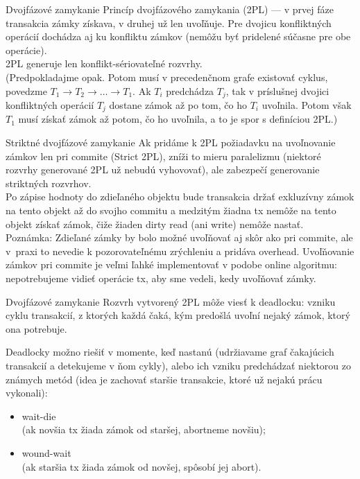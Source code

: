 \documentclass[12pt]{beamer}
\def\blue#1{\textcolor{Cerulean}{#1}}
\begin{document}
\begin{frame}[fragile]{Dvojfázové zamykanie}
Princíp dvojfázového zamykania (2PL) --- v prvej fáze transakcia zámky získava,
v druhej už len uvoľňuje. Pre dvojicu konfliktných operácií dochádza aj ku konfliktu zámkov
(nemôžu byť pridelené súčasne pre obe operácie).\\[2mm]

\blue{2PL generuje len konflikt-sériovateľné rozvrhy.}\\[2mm]

(Predpokladajme opak. Potom musí v precedenčnom grafe existovať cyklus,
povedzme $T_1 \rightarrow T_2 \rightarrow \dots \rightarrow T_1$.
Ak $T_i$ predchádza $T_j$, tak v príslušnej dvojici konfliktných operácií $T_j$ dostane zámok až po tom,
čo ho $T_i$ uvoľnila.
Potom však $T_1$ musí získať zámok až potom, čo ho uvoľnila, a to je spor s definíciou 2PL.)
\end{frame}


\begin{frame}[fragile]{Striktné dvojfázové zamykanie}
Ak pridáme k 2PL požiadavku na uvoľnovanie zámkov len pri commite (Strict 2PL), zníži to mieru paralelizmu
(niektoré rozvrhy generované 2PL už nebudú vyhovovať), ale zabezpečí generovanie striktných rozvrhov.\\[2mm]

Po zápise hodnoty do zdieľaného objektu bude transakcia držať exkluzívny zámok na tento objekt až do svojho commitu
a medzitým žiadna tx nemôže na tento objekt získať zámok, čiže žiaden dirty read (ani write) nemôže nastať.\\[2mm]

\scriptsize{Poznámka: Zdieľané zámky by bolo možné uvoľňovať aj skôr ako pri commite,
ale v~praxi to nevedie k pozorovateľnému zrýchleniu a pridáva overhead.
Uvoľňovanie zámkov pri commite je veľmi ľahké implementovať v podobe online algoritmu:
nepotrebujeme vidieť  operácie tx, aby sme vedeli, kedy uvoľňovať zámky.}
\end{frame}

\begin{frame}[fragile]{Dvojfázové zamykanie}
Rozvrh vytvorený 2PL môže viesť k \alert{deadlocku}:
vzniku cyklu transakcií, z ktorých každá čaká, kým predošlá uvoľní nejaký zámok, ktorý ona potrebuje.

Deadlocky možno riešiť v momente, keď nastanú (udržiavame graf čakajúcich transakcií a detekujeme v ňom cykly),
alebo ich vzniku predchádzať niektorou zo známych metód
(idea je zachovať staršie transakcie, ktoré už nejakú prácu vykonali):
\begin{itemize}
\item \blue{wait-die}\\ (ak novšia tx žiada zámok od staršej, abortneme novšiu);
\item \blue{wound-wait}\\ (ak staršia tx žiada zámok od novšej, spôsobí jej abort).
\end{itemize}
\end{frame}
\end{document}
